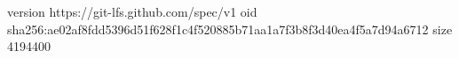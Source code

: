 version https://git-lfs.github.com/spec/v1
oid sha256:ae02af8fdd5396d51f628f1c4f520885b71aa1a7f3b8f3d40ea4f5a7d94a6712
size 4194400
